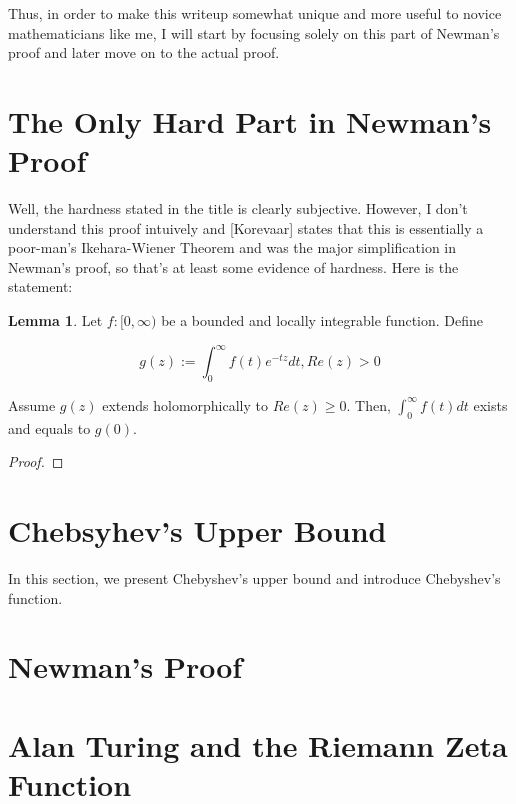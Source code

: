 \documentclass{article}
\theoremstyle{definition}
\newtheorem{lemma}[theorem]{Lemma}
\begin{document}
Thus, in order to make this writeup somewhat unique and more useful to novice 
mathematicians like me, I will start by focusing solely on this part of 
Newman's proof and later move on to the actual proof.

\newpage

\section{The Only Hard Part in Newman's Proof}

Well, the hardness stated in the title is clearly subjective. However, I don't understand
this proof intuively and [Korevaar] states that this is essentially a poor-man's
Ikehara-Wiener Theorem and was the major simplification in Newman's proof, so that's at least
some evidence of hardness. Here is the statement:

\begin{lemma}
    Let $ f:[0,\infty) $ be a bounded and locally integrable function.
    Define 

    \[ g(z) := \int_{0}^{\infty} f(t) e^{-tz} dt, Re(z) > 0 \]

    Assume $ g(z) $ extends holomorphically to $ Re(z) \geq 0 $.
    Then, $ \int_{0}^{\infty} f(t) dt $ exists and equals to $ g(0) $.
\end{lemma}
\begin{proof}
    
\end{proof}



\newpage


\section{Chebsyhev's Upper Bound}

In this section, we present Chebyshev's upper bound and introduce Chebyshev's function.



\newpage

\section{Newman's Proof}

\newpage

\section{Alan Turing and the Riemann Zeta Function}
\end{document}
